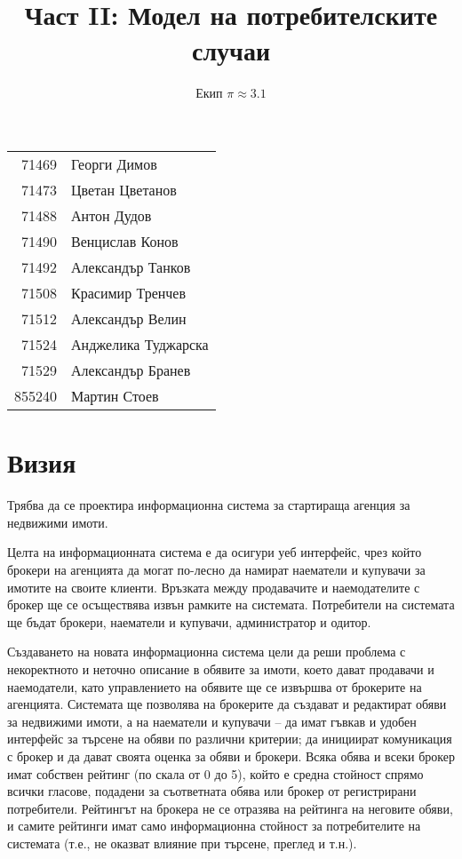 \documentclass[]{article}
\begin{document}
\title{\\Част II: Модел на потребителските случаи}
\author{Екип $\pi \approx 3.1$}

\maketitle

\begin{center}

\begin{tabular}{r|l}
71469	& Георги Димов \\ %
71473	& Цветан Цветанов \\ %
71488	& Антон Дудов \\ %
71490	& Венцислав Конов \\ %
71492	& Александър Танков \\ %
71508	& Красимир Тренчев \\ %
71512	& Александър Велин \\ %
71524	& Анджелика Туджарска \\ %
71529	& Александър Бранев \\ %
855240	& Мартин Стоев \\ %
\end{tabular}

\end{center}

\clearpage


\section*{Визия}

Трябва да се проектира информационна система за стартираща агенция за недвижими имоти.

Целта на информационната система е да осигури уеб интерфейс, чрез който брокери на агенцията да могат по-лесно да намират наематели и купувачи за имотите на своите клиенти. Връзката между продавачите и наемодателите с брокер ще се осъществява извън рамките на системата. Потребители на системата ще бъдат брокери, наематели и купувачи, администратор и одитор.

Създаването на новата информационна система цели да реши проблема с некоректното и неточно описание в обявите за имоти, което дават продавачи и наемодатели, като управлението на обявите ще се извършва от брокерите на агенцията. Системата ще позволява на брокерите да създават и редактират обяви за недвижими имоти, а на наематели и купувачи – да имат гъвкав и удобен интерфейс за търсене на обяви по различни критерии; да инициират комуникация с брокер и да дават своята оценка за обяви и брокери. Всяка обява и всеки брокер имат собствен рейтинг (по скала от 0 до 5), който е средна стойност спрямо всички гласове, подадени за съответната обява или брокер от регистрирани потребители. Рейтингът на брокера не се отразява на рейтинга на неговите обяви, и самите рейтинги имат само информационна стойност за потребителите на системата (т.е., не оказват влияние при търсене, преглед и т.н.).
\end{document}
